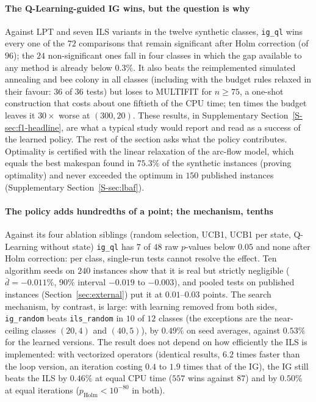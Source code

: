 \paragraph{The Q-Learning-guided IG wins, but the question is why}
Against LPT and seven ILS variants in the twelve synthetic classes, \texttt{ig\_ql} wins every one of the $72$ comparisons that remain significant after Holm correction (of $96$); the $24$
non-significant ones fall in four classes in which the gap available to any method is already below $0.3\%$. It also beats the reimplemented simulated annealing \citep{LiPerkins2024} and bee
colony \citep{DavidovicEtal2012} in all classes (including with the budget rules relaxed in their favour: $36$ of $36$ tests) but loses to MULTIFIT \citep{CoffmanGareyJohnson1978}
for $n\geq75$, a one-shot construction that costs about one fiftieth of the CPU time; ten times the budget leaves it $30\times$ worse at $(300,20)$. These results, in
Supplementary Section~\ref{S-sec:f1-headline}, are what a typical study would report and read as a success of the learned policy. The rest of the section asks what the policy contributes. Optimality
is certified with the linear relaxation of the arc-flow model, which equals the best makespan found in $75.3\%$ of the synthetic instances (proving optimality) and never exceeded the optimum in $150$
published instances (Supplementary Section~\ref{S-sec:lbaf}).

\paragraph{The policy adds hundredths of a point; the mechanism, tenths}
Against its four ablation siblings (random selection, UCB1, UCB1 per state, Q-Learning without state) \texttt{ig\_ql} has $7$ of $48$ raw $p$-values below $0.05$ and none after Holm correction: per
class, single-run tests cannot resolve the effect. Ten algorithm seeds on $240$ instances show that it is real but strictly negligible ($\bar d=-0.011\%$, 90\% interval $-0.019$ to $-0.003$), and
pooled tests on published instances (Section~\ref{sec:external}) put it at $0.01$--$0.03$ points. The search mechanism, by contrast, is large: with learning removed from both sides,
\texttt{ig\_random} beats \texttt{ils\_random} in $10$ of $12$ classes (the exceptions are the near-ceiling classes $(20,4)$ and $(40,5)$), by $0.49\%$ on seed averages, against $0.53\%$ for the learned versions. The result does not depend on how efficiently
the ILS is implemented: with vectorized operators (identical results, $6.2$ times faster than the loop version, an iteration costing $0.4$ to $1.9$ times that of the IG), the IG still beats the ILS by $0.46\%$ at equal CPU time ($557$ wins against $87$) and by $0.50\%$ at equal iterations ($p_{\mathrm{Holm}}<10^{-80}$ in both).

